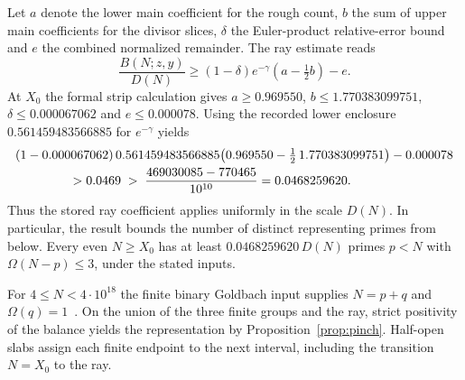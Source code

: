 \documentclass[11pt]{article}
\theoremstyle{remark}\newtheorem{remark}[theorem]{Remark}
\begin{document}
Let $a$ denote the lower main coefficient for the rough count, $b$ the sum of upper main coefficients for the divisor slices, $\delta$ the Euler-product relative-error bound and $e$ the combined normalized remainder. The ray estimate reads
\[
 \frac{B(N;z,y)}{D(N)}
 \ge (1-\delta)e^{-\gamma}(a-\tfrac12 b)-e .
\]
At $X_0$ the formal strip calculation gives $a\ge0.969550$, $b\le1.770383099751$, $\delta\le0.000067062$ and $e\le0.000078$. Using the recorded lower enclosure $0.561459483566885$ for $e^{-\gamma}$ yields
\begin{align*}
 &(1-0.000067062)\,0.561459483566885
 \bigl(0.969550-\tfrac12\,1.770383099751\bigr)-0.000078\\
 &\hspace{15mm} > 0.0469
 \;>\;\frac{469030085-770465}{10^{10}}
 =0.0468259620 .
\end{align*}
Thus the stored ray coefficient applies uniformly in the scale $D(N)$. In particular, the result bounds the number of distinct representing primes from below. Every even $N\ge X_0$ has at least $0.0468259620\,D(N)$ primes $p<N$ with $\Omega(N-p)\le3$, under the stated inputs.

For $4\le N<4\cdot10^{18}$ the finite binary Goldbach input supplies $N=p+q$ and $\Omega(q)=1$~\cite{OHP}. On the union of the three finite groups and the ray, strict positivity of the balance yields the representation by Proposition~\ref{prop:pinch}. Half-open slabs assign each finite endpoint to the next interval, including the transition $N=X_0$ to the ray.
\end{document}
